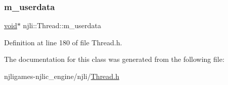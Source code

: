 \subsubsection{\texorpdfstring{m\+\_\+userdata}{m\_userdata}}
{\footnotesize\ttfamily \mbox{\hyperlink{_thread_8h_af1e856da2e658414cb2456cb6f7ebc66}{void}}$\ast$ njli\+::\+Thread\+::m\+\_\+userdata\hspace{0.3cm}{\ttfamily [private]}}



Definition at line 180 of file Thread.\+h.



The documentation for this class was generated from the following file\+:\begin{DoxyCompactItemize}
\item 
njligames-\/njlic\+\_\+engine/njli/\mbox{\hyperlink{_thread_8h}{Thread.\+h}}\end{DoxyCompactItemize}
